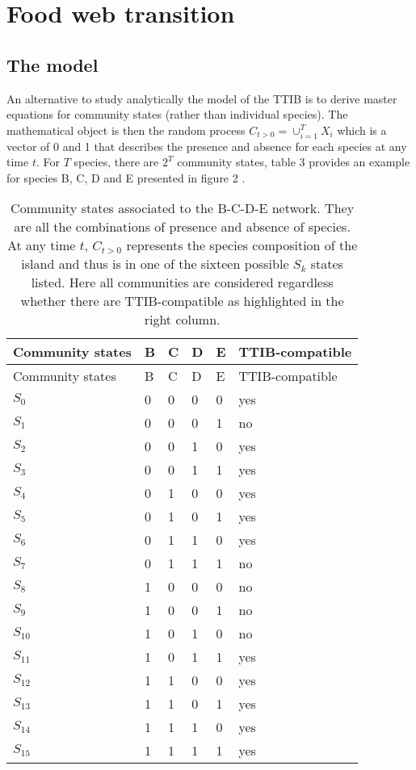 \label{annIII}
\addtocounter{chapter}{3}
\setcounter{equation}{0}

\section{Food web transition}\label{food-web-transition}

\subsection{The model}\label{the-model}

An alternative to study analytically the model of the TTIB is to derive
master equations for community states (rather than individual species).
The mathematical object is then the random process
\(C_{t>0}=\cup_{i=1}^TX_i\) which is a vector of 0 and 1 that describes
the presence and absence for each species at any time \(t\). For \(T\)
species, there are \(2^T\) community states, table 3 provides an example
for species B, C, D and E presented in figure 2 .

\begin{longtable}[]{@{}llllll@{}}
\caption{Community states associated to the B-C-D-E network. They are
all the combinations of presence and absence of species. At any time
\(t\), \(C_{t>0}\) represents the species composition of the island and
thus is in one of the sixteen possible \(S_k\) states listed. Here all
communities are considered regardless whether there are TTIB-compatible
as highlighted in the right column.}\tabularnewline
\toprule
Community states & B & C & D & E & TTIB-compatible\tabularnewline
\midrule
\endfirsthead
\toprule
Community states & B & C & D & E & TTIB-compatible\tabularnewline
\midrule
\endhead
\(S_{0}\) & 0 & 0 & 0 & 0 & yes\tabularnewline
\(S_{1}\) & 0 & 0 & 0 & 1 & no\tabularnewline
\(S_{2}\) & 0 & 0 & 1 & 0 & yes\tabularnewline
\(S_{3}\) & 0 & 0 & 1 & 1 & yes\tabularnewline
\(S_{4}\) & 0 & 1 & 0 & 0 & yes\tabularnewline
\(S_{5}\) & 0 & 1 & 0 & 1 & yes\tabularnewline
\(S_{6}\) & 0 & 1 & 1 & 0 & yes\tabularnewline
\(S_{7}\) & 0 & 1 & 1 & 1 & no\tabularnewline
\(S_{8}\) & 1 & 0 & 0 & 0 & no\tabularnewline
\(S_{9}\) & 1 & 0 & 0 & 1 & no\tabularnewline
\(S_{10}\) & 1 & 0 & 1 & 0 & no\tabularnewline
\(S_{11}\) & 1 & 0 & 1 & 1 & yes\tabularnewline
\(S_{12}\) & 1 & 1 & 0 & 0 & yes\tabularnewline
\(S_{13}\) & 1 & 1 & 0 & 1 & yes\tabularnewline
\(S_{14}\) & 1 & 1 & 1 & 0 & yes\tabularnewline
\(S_{15}\) & 1 & 1 & 1 & 1 & yes\tabularnewline
\bottomrule
\end{longtable}

